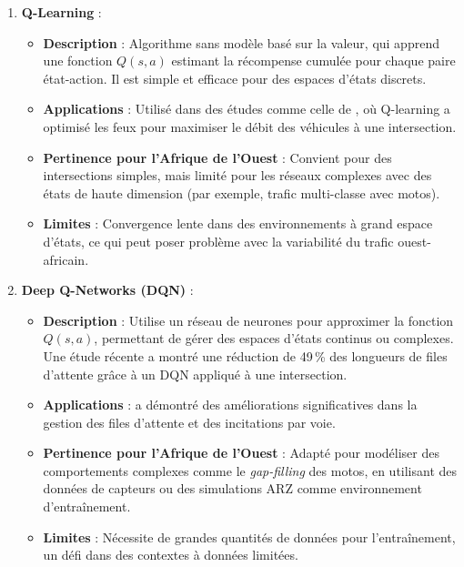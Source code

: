 \begin{enumerate}
    \item \textbf{Q-Learning} :  
        \begin{itemize}
            \item \textbf{Description} : Algorithme sans modèle basé sur la valeur, qui apprend une fonction $Q(s, a)$ estimant la récompense cumulée pour chaque paire état-action. Il est simple et efficace pour des espaces d'états discrets.
            \item \textbf{Applications} : Utilisé dans des études comme celle de \cite{traffic2020signal}, où Q-learning a optimisé les feux pour maximiser le débit des véhicules à une intersection.
            \item \textbf{Pertinence pour l'Afrique de l'Ouest} : Convient pour des intersections simples, mais limité pour les réseaux complexes avec des états de haute dimension (par exemple, trafic multi-classe avec motos).
            \item \textbf{Limites} : Convergence lente dans des environnements à grand espace d'états, ce qui peut poser problème avec la variabilité du trafic ouest-africain.
        \end{itemize}

    \item \textbf{Deep Q-Networks (DQN)} :  
        \begin{itemize}
            \item \textbf{Description} : Utilise un réseau de neurones pour approximer la fonction $Q(s, a)$, permettant de gérer des espaces d'états continus ou complexes. Une étude récente \cite{reinforcement2024approach} a montré une réduction de 49\,\% des longueurs de files d'attente grâce à un DQN appliqué à une intersection.
            \item \textbf{Applications} : \cite{reinforcement2024approach} a démontré des améliorations significatives dans la gestion des files d'attente et des incitations par voie.
            \item \textbf{Pertinence pour l'Afrique de l'Ouest} : Adapté pour modéliser des comportements complexes comme le \textit{gap-filling} des motos, en utilisant des données de capteurs ou des simulations ARZ comme environnement d'entraînement.
            \item \textbf{Limites} : Nécessite de grandes quantités de données pour l'entraînement, un défi dans des contextes à données limitées.
        \end{itemize}


\end{enumerate}

